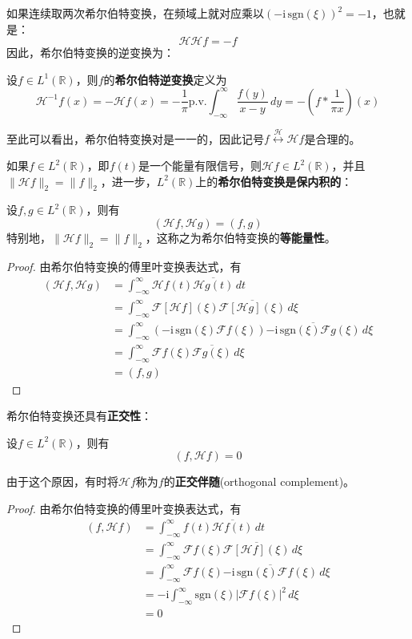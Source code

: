 \documentclass{ctexbook}
\begin{document}
如果连续取两次希尔伯特变换，在频域上就对应乘以$(-\mathrm{i}\,\text{sgn}(\xi))^2=-1$，也就是：
\[\mathcal{H} \mathcal{H} f=-f\]
因此，希尔伯特变换的逆变换为：
\begin{definition}[希尔伯特逆变换]
    设$f\in L^1(\mathbb{R})$，则$f$的\textbf{希尔伯特逆变换}定义为
    \[\mathcal{H} ^{-1} f(x)=-\mathcal{H} f(x)=-\frac{1}{\pi}\text{p.v.}\int_{-\infty}^{\infty}\frac{f(y)}{x-y}\,dy=-\left(f*\frac{1}{\pi x}\right)(x)\]
\end{definition}
至此可以看出，希尔伯特变换对是一一的，因此记号$f\overset{\mathcal{H} }{\longleftrightarrow} \mathcal{H} f$是合理的。

如果$f\in L^2(\mathbb{R})$，即$f(t)$是一个能量有限信号，则$\mathcal{H} f\in L^2(\mathbb{R})$，并且$\|\mathcal{H} f\|_2=\|f\|_2$，进一步，$L^2(\mathbb{R})$上的\textbf{希尔伯特变换是保内积的}：
\begin{theorem}
    设$f,g\in L^2(\mathbb{R})$，则有
    \[(\mathcal{H} f,\mathcal{H} g)=(f,g)\]
    特别地，$\|\mathcal{H} f\|_2=\|f\|_2$，这称之为希尔伯特变换的\textbf{等能量性}。
\end{theorem}
\begin{proof}
    由希尔伯特变换的傅里叶变换表达式，有
    \begin{align*}
        (\mathcal{H} f,\mathcal{H} g)&=\int_{-\infty}^{\infty}\mathcal{H} f(t)\overline{\mathcal{H} g(t)}\,dt\\
        &=\int_{-\infty}^{\infty}\mathcal{F} [\mathcal{H} f](\xi)\overline{\mathcal{F} [\mathcal{H} g](\xi)}\,d\xi\\
        &=\int_{-\infty}^{\infty}(-\mathrm{i}\,\text{sgn}(\xi)\mathcal{F} f(\xi))\overline{-\mathrm{i}\,\text{sgn}(\xi)\mathcal{F} g(\xi)}\,d\xi\\
        &=\int_{-\infty}^{\infty}\mathcal{F} f(\xi)\overline{\mathcal{F} g(\xi)}\,d\xi\\
        &=(f,g)
    \end{align*}
\end{proof}

希尔伯特变换还具有\textbf{正交性}：
\begin{theorem}
    设$f\in L^2(\mathbb{R})$，则有
    \[(f,\mathcal{H} f)=0\]
\end{theorem}
由于这个原因，有时将$\mathcal{H} f$称为$f$的\textbf{正交伴随}(orthogonal complement)。
\begin{proof}
    由希尔伯特变换的傅里叶变换表达式，有
    \begin{align*}
        (f,\mathcal{H} f)&=\int_{-\infty}^{\infty}f(t)\overline{\mathcal{H} f(t)}\,dt\\
        &=\int_{-\infty}^{\infty}\mathcal{F} f(\xi)\overline{\mathcal{F} [\mathcal{H} f](\xi)}\,d\xi\\
        &=\int_{-\infty}^{\infty}\mathcal{F} f(\xi)\overline{-\mathrm{i}\,\text{sgn}(\xi)\mathcal{F} f(\xi)}\,d\xi\\
        &=-\mathrm{i}\int_{-\infty}^{\infty}\text{sgn}(\xi)|\mathcal{F} f(\xi)|^2\,d\xi\\
        &=0
    \end{align*}
\end{proof}
\end{document}
